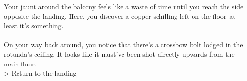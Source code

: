 Your jaunt around the balcony feels like a waste of time until you reach the side opposite the landing. Here, you discover a copper schilling left on the floor--at least it's something.\\
\\

On your way back around, you notice that there's a crossbow bolt lodged in the rotunda's ceiling. It looks like it must've been shot directly upwards from the main floor.\\

> Return to the landing -- 
